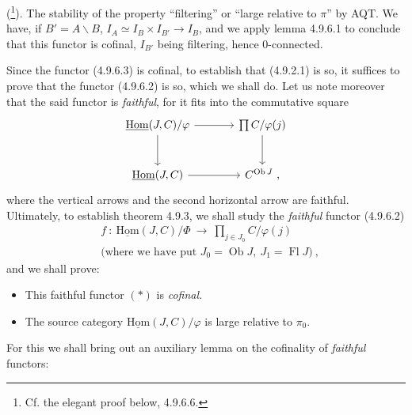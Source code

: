\documentclass[11pt]{article}
\newcommand{\printedpage}[1]{\marginpar{\footnotesize p.~#1}}
\newcommand{\msp}[1]{\marginpar{\footnotesize [#1]}}
\newcommand{\uHom}{\underline{\mathrm{Hom}}}
\newcommand{\Ob}{\operatorname{Ob}}
\newcommand{\Fl}{\operatorname{Fl}}
\begin{document}
(\footnote[98]{Cf. the elegant proof below, 4.9.6.6.}). The stability of the property ``filtering'' or ``large relative to $\pi$'' by AQT. We have, if $B' = A\backslash B$, $I_A \simeq I_B \times I_{B'} \longrightarrow I_B$, and we apply lemma 4.9.6.1 to conclude that this functor is cofinal, $I_{B'}$ being filtering, hence 0-connected.

\msp{page 223}Since the functor (4.9.6.3) is cofinal, to establish that (4.9.2.1) is so, it suffices to prove that the functor (4.9.6.2) is so, which we shall do. Let us note moreover that the said functor is \textit{faithful}, for it fits into the commutative square
\[
\begin{tikzcd}[column sep=large, row sep=large]
\uHom(J,C)/\varphi \arrow[r] \arrow[d] & \prod C/\varphi(j) \arrow[d] \\
\uHom(J,C) \arrow[r] & C^{\Ob J}\ ,
\end{tikzcd}
\]
\printedpage{81}
where the vertical arrows and the second horizontal arrow are faithful. Ultimately, to establish theorem 4.9.3, we shall study the \textit{faithful} functor (4.9.6.2)
\[
\begin{aligned}
&f \ : \ \uHom(J,C)/\Phi \ \longrightarrow \ \textstyle\prod_{j \in J_0} C/\varphi(j) \\ %
&\text{(where we have put } J_0 = \Ob J,\ J_1 = \Fl J) \ ,
\end{aligned}
\tag*{$(*)$}
\]
and we shall prove:
\begin{itemize}[label={}]
\item[\textcircled{a}] This faithful functor $(*)$ is \textit{cofinal.}
\item[\textcircled{b}] The source category $\uHom(J,C)/\varphi$ is large relative to $\pi_0$.
\end{itemize}
For this we shall bring out an auxiliary lemma on the cofinality of \textit{faithful} functors:
\end{document}
